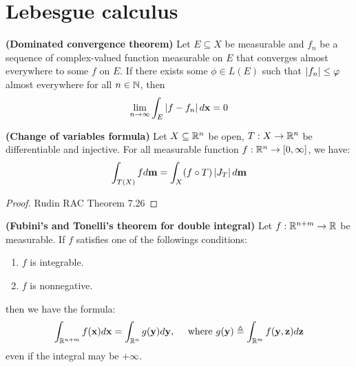 \documentclass{report}
\begin{document}
\section{Lebesgue calculus}
\begin{theorem}
\label{THdct}
\textbf{(Dominated convergence theorem)} Let $E\subseteq X$ be measurable and $f_n$ be a sequence of complex-valued function measurable on $E$ that converges almost everywhere to some $f$ on $E$. If there exists some $\phi \in L(E)$ such that $\left|f_n\right|\leq  \varphi$ almost everywhere for all $n \in\mathbb{N}$, then 
\begin{align*}
\lim_{n\to \infty} \int_E \left|f-f_n\right| d \textbf{x}=0 
\end{align*}
\end{theorem}
\begin{theorem}
\label{THcovf}
\textbf{(Change of variables formula)} Let $X \subseteq \mathbb{R}^n$ be open, $T: X \rightarrow \mathbb{R}^n$ be differentiable and injective. For all measurable function $f: \mathbb{R}^n \rightarrow [0,\infty]$, we have:  
\begin{align*}
\int_{T(X)} f d\textbf{m}= \int_X (f \circ T) \left|J_T\right| d \textbf{m}
\end{align*}
\end{theorem}
\begin{proof}
Rudin RAC Theorem 7.26
\end{proof}
\begin{theorem}
\label{THFaT}
\textbf{(Fubini's and Tonelli's theorem for double integral)} Let $f:\mathbb{R}^{n+m} \rightarrow \mathbb{R}$ be measurable. If $f$ satisfies one of the followings conditions: 
\begin{enumerate}[label=(\Roman*)]
  \item $f$ is integrable.  
  \item $f$ is nonnegative. 
\end{enumerate}
then we have the formula: 
\begin{align*}
\int_{\mathbb{R}^{n+m}} f(\textbf{x})d \textbf{x} = \int_{\mathbb{R}^n} g(\textbf{y}) d\textbf{y},\quad \text{ where } g(\textbf{y})\triangleq \int_{\mathbb{R}^m} f(\textbf{y},\textbf{z}) d\textbf{z}
\end{align*}
even if the integral may be $+\infty$. 
\end{theorem}
\end{document}
